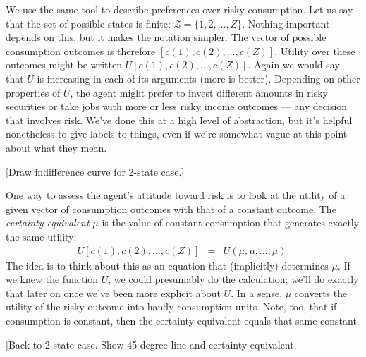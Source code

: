 \documentclass[11pt]{article}
\begin{document}
We use the same tool to describe preferences
over risky consumption.
Let us say that the set of possible states is finite:
$ \mathcal{Z} = \{ 1, 2, \ldots, Z \}$.
Nothing important depends on this, but it makes the notation simpler.
The vector of possible consumption outcomes is therefore
$[c(1), c(2), \ldots, c(Z)]$.
Utility over these outcomes might be written
$U [c(1), c(2), \ldots, c(Z)]$.
Again we would say that $U$ is increasing in each of its arguments
(more is better).
Depending on other properties of $U$,
the agent might prefer to invest different amounts in
risky securities or take jobs with more or less risky income outcomes ---
any decision that involves risk.
We've done this at a high level of abstraction,
but it's helpful nonetheless to give labels to things,
even if we're somewhat vague at this point about what they mean.

[Draw indifference curve for 2-state case.]

One way to assess the agent's attitude toward risk
is to look at the utility of a given
vector of consumption outcomes
with that of a constant outcome.
The {\it certainty equivalent\/} $\mu$
is the value of constant consumption
that generates exactly the same utility:
\begin{eqnarray}
    U [c(1), c(2), \ldots, c(Z)]
            &=& U (\mu, \mu, \ldots, \mu ) .
    \label{eq:certequiv-def}
\end{eqnarray}
The idea is to think about this as an equation that (implicitly) determines $\mu$.
If we knew the function $U$, we could presumably do the calculation;
we'll do exactly that later on once we've been more explicit about $U$.
In a sense, $\mu$ converts the utility of the risky outcome
into handy consumption units.
Note, too, that if consumption is constant, then the certainty
equivalent equals that same constant.

[Back to 2-state case.
Show 45-degree line and certainty equivalent.]
\end{document}
